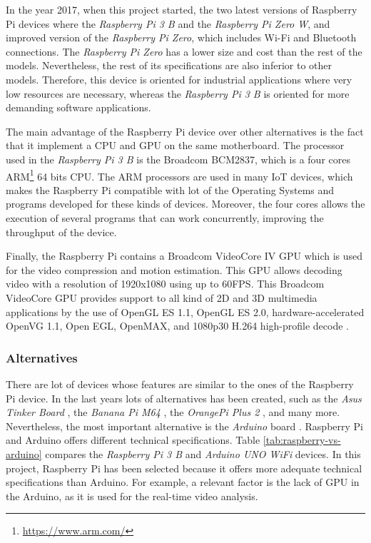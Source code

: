 In the year 2017, when this project started, the two latest versions of Raspberry Pi devices where the \textit{Raspberry Pi 3 B} and the \textit{Raspberry Pi Zero W}, and improved version of the \textit{Raspberry Pi Zero}, which includes Wi-Fi and Bluetooth connections. The \textit{Raspberry Pi Zero} has a lower size and cost than the rest of the models. Nevertheless, the rest of its specifications are also inferior to other models. Therefore, this device is oriented for industrial applications where very low resources are necessary, whereas the \textit{Raspberry Pi 3 B} is oriented for more demanding software applications.

The main advantage of the Raspberry Pi device over other alternatives is the fact that it implement a \ac{CPU} and \ac{GPU} on the same motherboard. The processor used in the \textit{Raspberry Pi 3 B} is the Broadcom BCM2837, which is a four cores ARM\footnote{\url{https://www.arm.com/}} 64 bits \ac{CPU}. The ARM processors are used in many \ac{IoT} devices, which makes the Raspberry Pi compatible with lot of the Operating Systems and programs developed for these kinds of devices. Moreover, the four cores allows the execution of several programs that can work concurrently, improving the throughput of the device.

Finally, the Raspberry Pi contains a Broadcom VideoCore IV \ac{GPU} which is used for the video compression and motion estimation. This \ac{GPU} allows decoding video with a resolution of 1920x1080 using up to 60\ac{FPS}. This Broadcom VideoCore \ac{GPU} provides support to all kind of 2D and 3D multimedia applications by the use of OpenGL ES 1.1, OpenGL ES 2.0, hardware-accelerated OpenVG 1.1, Open EGL, OpenMAX, and 1080p30 H.264 high-profile decode \cite{VideoCoreIV}.


\subsubsection{Alternatives}
There are lot of devices whose features are similar to the ones of the Raspberry Pi device. In the last years lots of alternatives has been created, such as the \textit{Asus Tinker Board} \cite{Tinker}, the \textit{Banana Pi M64} \cite{M64}, the \textit{OrangePi Plus 2} \cite{OrangePi}, and many more. Nevertheless, the most important alternative is the \textit{Arduino} board \cite{Arduino}. Raspberry Pi and Arduino offers different technical specifications. Table \ref{tab:raspberry-vs-arduino} compares the \textit{Raspberry Pi 3 B} and \textit{Arduino UNO WiFi} devices. In this project, Raspberry Pi has been selected because it offers more adequate technical specifications than Arduino. For example, a relevant factor is the lack of \ac{GPU} in the Arduino, as it is used for the real-time video analysis.

